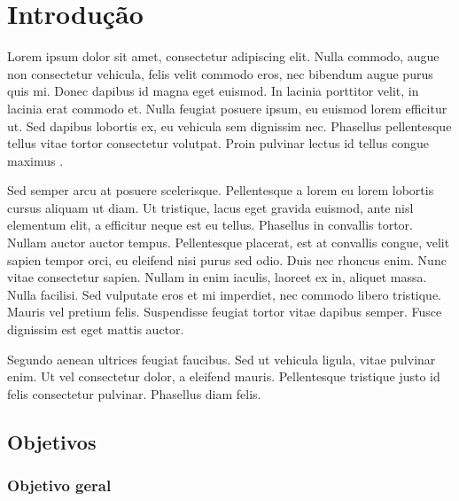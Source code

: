 \documentclass[brazil,hardcopy,openany,a5paper]{ufscthesis}
\begin{document}
	
	\frontmatter
	\folhadeaprovacao{}{} %
	\paginaresumo
	\paginaabstract
	\listadefiguras %
	\listadetabelas 
	\sumario
	\mainmatter

	\chapter{Introdução}
	\label{chapter:introducao}
	
	Lorem ipsum dolor sit amet, consectetur adipiscing elit. Nulla commodo, augue non consectetur vehicula, felis velit commodo eros, nec bibendum augue purus quis mi. Donec dapibus id magna eget euismod. In lacinia porttitor velit, in lacinia erat commodo et. Nulla feugiat posuere ipsum, eu euismod lorem efficitur ut. Sed dapibus lobortis ex, eu vehicula sem dignissim nec. Phasellus pellentesque tellus vitae tortor consectetur volutpat. Proin pulvinar lectus id tellus congue maximus \cite{2002boundary}.
	
	Sed semper arcu at posuere scelerisque. Pellentesque a lorem eu lorem lobortis cursus aliquam ut diam. Ut tristique, lacus eget gravida euismod, ante nisl elementum elit, a efficitur neque est eu tellus. Phasellus in convallis tortor. Nullam auctor auctor tempus. Pellentesque placerat, est at convallis congue, velit sapien tempor orci, eu eleifend nisi purus sed odio. Duis nec rhoncus enim. Nunc vitae consectetur sapien. Nullam in enim iaculis, laoreet ex in, aliquet massa. Nulla facilisi. Sed vulputate eros et mi imperdiet, nec commodo libero tristique. Mauris vel pretium felis. Suspendisse feugiat tortor vitae dapibus semper. Fusce dignissim est eget mattis auctor.
	
	Segundo  \cite{Chen2013} aenean ultrices feugiat faucibus. Sed ut vehicula ligula, vitae pulvinar enim. Ut vel consectetur dolor, a eleifend mauris. Pellentesque tristique justo id felis consectetur pulvinar. Phasellus diam felis.
	
	\section{Objetivos}
		\subsection{Objetivo geral}
\end{document}
